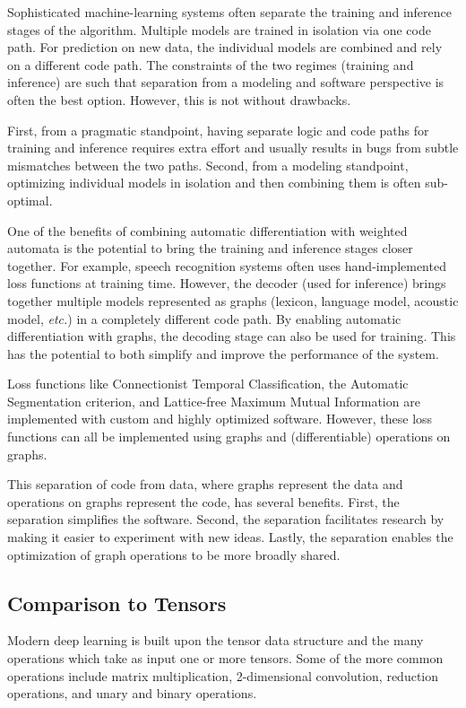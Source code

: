 Sophisticated machine-learning systems often separate the training and
inference stages of the algorithm. Multiple models are trained in isolation via
one code path. For prediction on new data, the individual models are combined
and rely on a different code path. The constraints of the two regimes (training
and inference) are such that separation from a modeling and software
perspective is often the best option. However, this is not without drawbacks.

First, from a pragmatic standpoint, having separate logic and code paths for
training and inference requires extra effort and usually results in bugs from
subtle mismatches between the two paths. Second, from a modeling standpoint,
optimizing individual models in isolation and then combining them is often
sub-optimal.

One of the benefits of combining automatic differentiation with weighted
automata is the potential to bring the training and inference stages closer
together. For example, speech recognition systems often uses hand-implemented
loss functions at training time. However, the decoder (used for inference)
brings together multiple models represented as graphs (lexicon, language model,
acoustic model, \emph{etc.}) in a completely different code path. By enabling
automatic differentiation with graphs, the decoding stage can also be used for
training.  This has the potential to both simplify and improve the performance
of the system.

Loss functions like Connectionist Temporal Classification, the Automatic
Segmentation criterion, and Lattice-free Maximum Mutual Information are
implemented with custom and highly optimized software. However, these loss
functions can all be implemented using graphs and (differentiable) operations
on graphs.

This separation of code from data, where graphs represent the data and
operations on graphs represent the code, has several benefits. First, the
separation simplifies the software. Second, the separation facilitates research
by making it easier to experiment with new ideas. Lastly, the separation
enables the optimization of graph operations to be more broadly shared.

\subsection{Comparison to Tensors}
\label{sec:comparison_to_tensors}

Modern deep learning is built upon the tensor data structure and the many
operations which take as input one or more tensors. Some of the more common
operations include matrix multiplication, 2-dimensional convolution, reduction
operations, and unary and binary operations.

